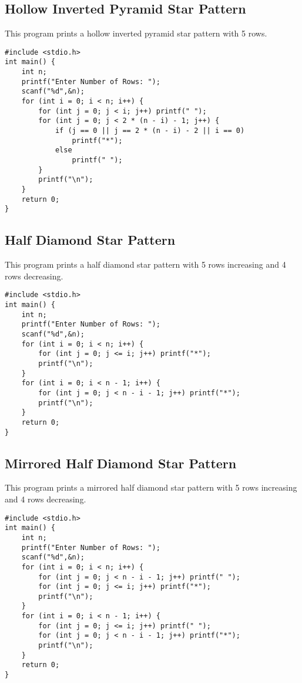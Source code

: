 \documentclass[a4paper,12pt]{article}
\begin{document}
\subsection{Hollow Inverted Pyramid Star Pattern}
This program prints a hollow inverted pyramid star pattern with 5 rows.
\begin{lstlisting}[caption={Hollow Inverted Pyramid Star Pattern}]
#include <stdio.h>
int main() {
    int n;
    printf("Enter Number of Rows: ");
    scanf("%d",&n);
    for (int i = 0; i < n; i++) {
        for (int j = 0; j < i; j++) printf(" ");
        for (int j = 0; j < 2 * (n - i) - 1; j++) {
            if (j == 0 || j == 2 * (n - i) - 2 || i == 0)
                printf("*");
            else
                printf(" ");
        }
        printf("\n");
    }
    return 0;
}
\end{lstlisting}
\clearpage

\subsection{Half Diamond Star Pattern}
This program prints a half diamond star pattern with 5 rows increasing and 4 rows decreasing.
\begin{lstlisting}[caption={Half Diamond Star Pattern}]
#include <stdio.h>
int main() {
    int n;
    printf("Enter Number of Rows: ");
    scanf("%d",&n);
    for (int i = 0; i < n; i++) {
        for (int j = 0; j <= i; j++) printf("*");
        printf("\n");
    }
    for (int i = 0; i < n - 1; i++) {
        for (int j = 0; j < n - i - 1; j++) printf("*");
        printf("\n");
    }
    return 0;
}
\end{lstlisting}
\clearpage

\subsection{Mirrored Half Diamond Star Pattern}
This program prints a mirrored half diamond star pattern with 5 rows increasing and 4 rows decreasing.
\begin{lstlisting}[caption={Mirrored Half Diamond Star Pattern}]
#include <stdio.h>
int main() {
    int n;
    printf("Enter Number of Rows: ");
    scanf("%d",&n);
    for (int i = 0; i < n; i++) {
        for (int j = 0; j < n - i - 1; j++) printf(" ");
        for (int j = 0; j <= i; j++) printf("*");
        printf("\n");
    }
    for (int i = 0; i < n - 1; i++) {
        for (int j = 0; j <= i; j++) printf(" ");
        for (int j = 0; j < n - i - 1; j++) printf("*");
        printf("\n");
    }
    return 0;
}
\end{lstlisting}
\clearpage
\end{document}
